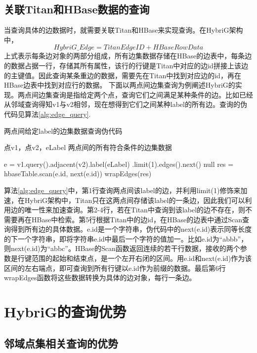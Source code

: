 \subsection{关联Titan和HBase数据的查询}
当查询具体的边数据时，就需要关联Titan和HBase来实现查询。在HybriG架构中，
$$HybriG\_Edge = TitanEdgeID + HBaseRowData$$
上式表示每条边对象的两部分组成，所有边集数据存储在HBase的边表中，每条边的数据占据一行，存储其所有属性，该行的行键是Titan中对应的边id拼接上该边的主键值。因此查询某条重边的数据，需要先在Titan中找到对应边的id，再在HBase边表中找到对应行的数据。
下面以两点间边集查询为例阐述HybriG的实现。两点间边集查询是指给定两个点，查询它们之间满足某种条件的边。比如已经从邻域查询得知v1与v2相邻，现在想得到它们之间某种label的所有边。查询的伪代码见算法\ref{alg:edge_query}.
\begin{algorithm}
\caption{两点间给定label的边集数据查询伪代码}
\label{alg:edge_query}
\begin{algorithmic}[1] %
\REQUIRE 点v1，点v2，eLabel
\ENSURE 两点间的所有符合条件的边集数据

\STATE e = v1.query().adjacent(v2).label(eLabel)
.limit(1).edges().next()
\RETURN null
\ENDIF
\STATE res = hbaseTable.scan(e.id, next(e.id))
\RETURN wrapEdges(res)
\end{algorithmic}
\end{algorithm}

算法\ref{alg:edge_query}中，第1行查询两点间该label的边，并利用limit(1)修饰来加速，在HybriG架构中，Titan只在这两点间存储该label的一条边，因此我们可以利用边的唯一性来加速查询。第2-4行，若在Titan中查询到该label的边不存在，则不需要再在HBase中检索。第5行根据Titan中的边id，在HBase的边表中通过Scan查询得到所有边的具体数据。e.id是一个字符串，伪代码中的next(e.id)表示同等长度的下一个字符串，即将字符串e.id中最后一个字符的值加一。比如e.id为“abbb”，则next(e.id)为“abbc”。HBase的Scan函数返回连续的若干行数据，接收的两个参数是行键范围的起始和结束点，是一个左开右闭的区间。用e.id和next(e.id)作为该区间的左右端点，即可查询到所有行键以e.id作为前缀的数据。最后第6行wrapEdges函数将这些数据转换为具体的边对象，每行一条边。

\section{HybriG的查询优势}
\subsection{邻域点集相关查询的优势}

